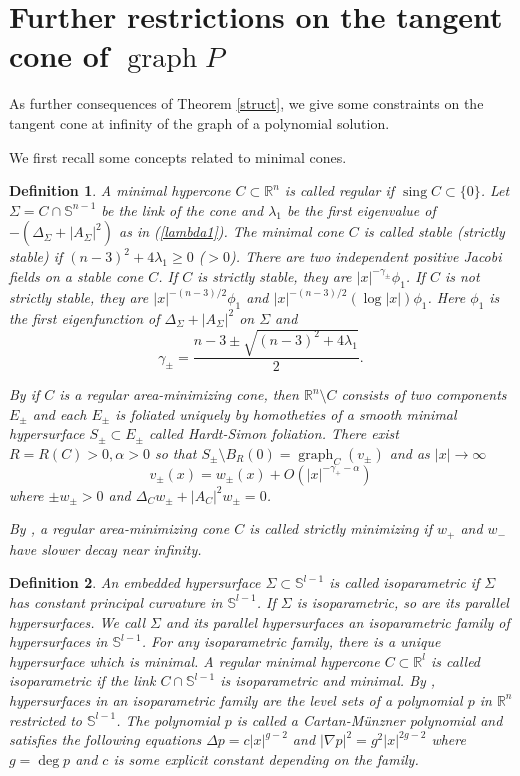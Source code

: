 \documentclass[pdflatex,sn-mathphys-num]{sn-jnl}%
\theoremstyle{thmstyleone}%
\theoremstyle{thmstyletwo}%
\theoremstyle{thmstylethree}%
\newtheorem{definition}{Definition}%
\newcommand{\R}{\mathbb{R}}
\newcommand{\SSS}{\mathbb{S}}
\DeclareMathOperator{\sing}{sing}
\DeclareMathOperator{\graph}{graph}
\begin{document}
\section{Further restrictions on the tangent cone of \texorpdfstring{$\graph P$}{graph P}}
\label{5}
As further consequences of Theorem \ref{struct}, we give some constraints on the tangent cone at infinity of the graph of a polynomial solution.


We first recall some concepts related to minimal cones.
\begin{definition}\label{sssm}
	A minimal hypercone $C\subset \R^n$ is called \textit{regular} if $\sing C\subset\{0\}$. Let $\Sigma=C\cap \SSS^{n-1}$ be the link of the cone and $\lambda_1$ be the first eigenvalue of $-(\Delta_\Sigma+|A_\Sigma|^2)$ as in (\ref{lambda1}). The minimal cone $C$ is called \textit{stable} (\textit{strictly stable}) if $(n-3)^2+4\lambda_1\ge 0$ ($>0$). There are two independent positive Jacobi fields on a stable cone $C$. If $C$ is strictly stable, they are $|x|^{-\gamma_\pm}\phi_1$. If $C$ is not strictly stable, they are $|x|^{-(n-3)/2}\phi_1$ and $|x|^{-(n-3)/2}(\log |x|)\phi_1$. Here $\phi_1$ is the first eigenfunction of $\Delta_\Sigma+|A_\Sigma|^2$ on $\Sigma$ and
	\begin{equation}\label{gamma}
		\gamma_{\pm}=\frac{n-3\pm\sqrt{(n-3)^2+4\lambda_1}}{2}.
	\end{equation}
	
	
	By \cite[Theorem 2.1]{simon1985area} if $C$ is a regular area-minimizing cone, then $\R^{n}\setminus C$ consists of two components $E_\pm$ and each $E_\pm$ is foliated uniquely by homotheties of a smooth minimal hypersurface $S_\pm\subset E_\pm$ called \textit{Hardt-Simon foliation}. There exist $R=R(C)>0,\alpha>0$ so that $S_\pm\setminus B_R(0)=\graph_C(v_\pm)$ and as $|x|\to\infty$
	\[ v_\pm(x)=w_\pm(x)+O(|x|^{-\gamma_{+}-\alpha})\] where $\pm w_\pm>0$ and $\Delta _Cw_\pm+|A_C|^2w_\pm=0$.
	
	By \cite[Theorem 3.1]{simon1985area}, a regular area-minimizing cone $C$ is called \textit{strictly minimizing} if $w_+$ and $w_-$ have slower decay near infinity.
\end{definition}


\begin{definition}
	An embedded hypersurface $\Sigma\subset \SSS^{l-1}$ is called \textit{isoparametric} if $\Sigma$ has constant principal curvature in $\SSS^{l-1}$. If  $\Sigma$ is isoparametric, so are its parallel hypersurfaces. We call $\Sigma$ and its parallel hypersurfaces an \textit{isoparametric family} of hypersurfaces in $\SSS^{l-1}$. For any isoparametric family, there is a unique hypersurface which is minimal. A regular minimal hypercone $C\subset\R^l$ is called \textit{isoparametric} if the link $C\cap \SSS^{l-1}$ is isoparametric and minimal. By \cite{Car,Mu1,Mu2}, hypersurfaces in an isoparametric family are the level sets of a polynomial $p$ in $\R^n$ restricted to $\SSS^{l-1}$. The polynomial $p$ is called a \textit{Cartan-M\"unzner polynomial} and satisfies the following equations
    $\Delta p=c|x|^{g-2}$ and $|\nabla p|^2=g^2|x|^{2g-2}$ where $g=\deg p$ and $c$ is some explicit constant depending on the family.
\end{definition}
\end{document}
